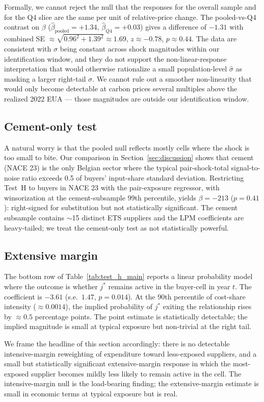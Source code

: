 Formally, we cannot reject the null that the responses for the overall sample and for the Q4 slice are the same per unit of relative-price change. The pooled-vs-Q4 contrast on $\beta$ ($\widehat{\beta}_{\text{pooled}} = +1.34$, $\widehat{\beta}_{Q4} = +0.03$) gives a difference of $-1.31$ with combined SE $\approx \sqrt{0.96^2 + 1.39^2} \approx 1.69$, $z \approx -0.78$, $p \approx 0.44$. The data are consistent with $\sigma$ being constant across shock magnitudes within our identification window, and they do not support the non-linear-response interpretation that would otherwise rationalize a small population-level $\widehat{\sigma}$ as masking a larger right-tail $\sigma$. We cannot rule out a smoother non-linearity that would only become detectable at carbon prices several multiples above the realized 2022 EUA --- those magnitudes are outside our identification window.

\subsection{Cement-only test}

A natural worry is that the pooled null reflects mostly cells where the shock is too small to bite. Our \citet{peter2023} comparison in Section~\ref{sec:discussion} shows that cement (NACE 23) is the only Belgian sector where the typical pair-shock-total signal-to-noise ratio exceeds 0.5 of buyers' input-share standard deviation. Restricting Test~H to buyers in NACE 23 with the pair-exposure regressor, with winsorization at the cement-subsample 99th percentile, yields $\beta = -213$ ($p = 0.41$): right-signed for substitution but not statistically significant. The cement subsample contains $\sim$15 distinct ETS suppliers and the LPM coefficients are heavy-tailed; we treat the cement-only test as not statistically powerful.

\subsection{Extensive margin}

The bottom row of Table~\ref{tab:test_h_main} reports a linear probability model where the outcome is whether $j^*$ remains active in the buyer-cell in year $t$. The coefficient is $-3.61$ (s.e.\ $1.47$, $p = 0.014$). At the 90th percentile of cost-share intensity ($\approx 0.0014$), the implied probability of $j^*$ exiting the relationship rises by $\approx 0.5$ percentage points. The point estimate is statistically detectable; the implied magnitude is small at typical exposure but non-trivial at the right tail.

We frame the headline of this section accordingly: there is no detectable intensive-margin reweighting of expenditure toward less-exposed suppliers, and a small but statistically significant extensive-margin response in which the most-exposed supplier becomes mildly less likely to remain active in the cell. The intensive-margin null is the load-bearing finding; the extensive-margin estimate is small in economic terms at typical exposure but is real.
